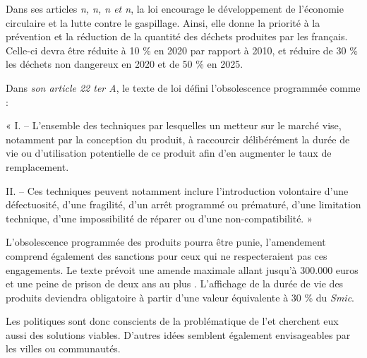 \bigbreak
Dans ses articles \textit{n, n, n et n}, la loi encourage le développement de l’économie circulaire et la lutte contre le gaspillage. Ainsi, elle donne la priorité à la prévention et la réduction de la quantité des déchets produites par les français. Celle-ci devra être réduite à 10 \%  en 2020 par rapport à 2010, et réduire de 30 \% les déchets non dangereux en 2020 et de 50 \% en 2025.


\bigbreak
Dans \textit{son article 22 ter A}, le texte de loi défini l’obsolescence programmée comme :

\begin{itshape}« I. – L’ensemble des techniques par lesquelles un metteur sur le marché vise, notamment par la conception du produit, à raccourcir délibérément la durée de vie ou d’utilisation potentielle de ce produit afin d’en augmenter le taux de remplacement.

II. – Ces techniques peuvent notamment inclure l’introduction volontaire d’une défectuosité, d’une fragilité, d’un arrêt programmé ou prématuré, d’une limitation technique, d’une impossibilité de réparer ou d’une non-compatibilité. »
\end{itshape}

\bigbreak
L’obsolescence programmée des produits pourra être punie, l’amendement comprend également des sanctions pour ceux qui ne respecteraient pas ces engagements. Le texte prévoit une amende maximale allant jusqu'à 300.000 euros et une peine de prison de deux ans au plus \cite{sanctionloi}. L'affichage de la durée de vie des produits deviendra obligatoire à partir d'une valeur équivalente à 30 \% du \textit{Smic}.


Les politiques sont donc conscients de la problématique de l'\op et cherchent eux aussi des solutions viables. D'autres idées semblent également envisageables par les villes ou communautés.